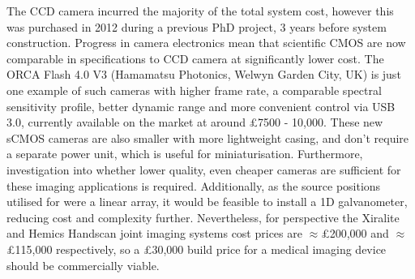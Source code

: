\documentclass[twoside]{bhamthesis}
\theoremstyle{definition}
\begin{document}
The CCD camera incurred the majority of the total system cost, however this was purchased in 2012 during a previous PhD project, 3 years before system construction. Progress in camera electronics mean that scientific CMOS are now comparable in specifications to CCD camera at significantly lower cost. The ORCA Flash 4.0 V3 (Hamamatsu Photonics, Welwyn Garden City, UK) is just one example of such cameras with higher frame rate, a comparable spectral sensitivity profile, better dynamic range and more convenient control via USB 3.0, currently available on the market at around \pounds 7500 - 10,000. These new sCMOS cameras are also smaller with more lightweight casing, and don't require a separate power unit, which is useful for miniaturisation. Furthermore, investigation into whether lower quality, even cheaper cameras are sufficient for these imaging applications is required. Additionally, as the source positions utilised for were a linear array, it would be feasible to install a 1D galvanometer, reducing cost and complexity further. Nevertheless, for perspective the Xiralite and Hemics Handscan joint imaging systems cost prices are $\approx$\pounds 200,000 and $\approx$\pounds 115,000 respectively, so a \pounds 30,000 build price for a medical imaging device should be commercially viable.


\end{document}
